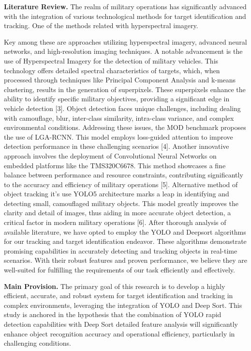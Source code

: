 \begin{multicols}{2}
{\bfseries Literature Review.} The realm of military operations has
significantly advanced with the integration of various technological
methods for target identification and tracking. One of the methods
related with hyperspectral imagery.

Key among these are approaches utilizing hyperspectral imagery, advanced
neural networks, and high-resolution imaging techniques. A notable
advancement is the use of Hyperspectral Imagery for the detection of
military vehicles. This technology offers detailed spectral
characteristics of targets, which, when processed through techniques
like Principal Component Analysis and k-means clustering, results in the
generation of superpixels. These superpixels enhance the ability to
identify specific military objectives, providing a significant edge in
vehicle detection {[}3{]}. Object detection faces unique challenges,
including dealing with camouflage, blur, inter-class similarity,
intra-class variance, and complex environmental conditions. Addressing
these issues, the MOD benchmark proposes the use of LGA-RCNN. This model
employs loss-guided attention to improve detection performance in these
challenging scenarios {[}4{]}. Another innovative approach involves the
deployment of Convolutional Neural Networks on embedded platforms like
the TMS320C6678. This method showcases a fine balance between
performance and resource constraints, contributing significantly to the
accuracy and efficiency of military operations {[}5{]}. Alternative
method of object tracking it's use YOLO5 architecture marks a leap in
identifying and detecting small, camouflaged military objects. This
model greatly improves the clarity and detail of images, thus aiding in
more accurate object detection, a critical factor in modern military
operations {[}6{]}. After thorough analysis of available literature, we
have opted to employ the YOLO and Deepsort algorithms for our tracking
and target identification endeavor. These algorithms demonstrate
promising capabilities in accurately detecting and tracking objects in
real-time scenarios. With their robust features and proven performance,
we believe they are well-suited for fulfilling the requirements of our
task efficiently and effectively.

{\bfseries Main Provision.} The primary goal of this research is to develop
a highly efficient, accurate, and robust system for target
identification and tracking in complex environments, leveraging the
integration of YOLO and Deep Sort. This study is anchored in the
hypothesis that the combination of YOLO rapid detection capabilities
with Deep Sort detailed feature analysis will significantly enhance
object recognition accuracy and operational efficiency, particularly in
challenging conditions.
\end{multicols}

